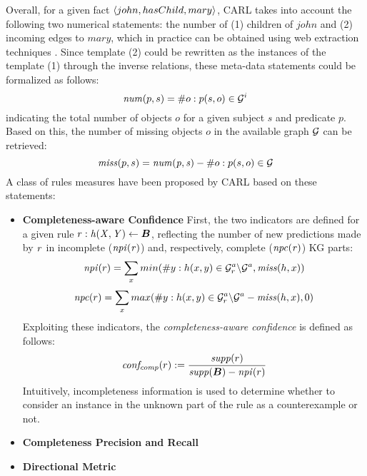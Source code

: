 Overall, for a given fact $\langle john, hasChild, mary\rangle$, CARL takes into account the following two numerical statements: the number of (1) children of $john$ and (2) incoming edges to $mary$, which in practice can be obtained using web extraction techniques \cite{cardinality-extraction-iswc-2016}. Since template (2) could be rewritten as the instances of the template (1) through the inverse relations, these meta-data statements could be formalized as follows:
\[\mathit{num}(p,s) = \# o : p(s,o) \in \mathcal{G}^i\]
indicating the total number of objects $o$ for a given subject $s$ and predicate $p$. Based on this, the number of missing objects $o$ in the available graph $\mathcal{G}$ can be retrieved:
\[\mathit{miss}(p,s) = \mathit{num(p,s)} - \#o : p(s,o) \in \mathcal{G}\]
A class of rules measures have been proposed by CARL based on these statements:
\begin{itemize}
\item \textbf{Completeness-aware Confidence}
First, the two indicators are defined for a given rule $r: %
\mi{h(X,Y)}\leftarrow \vec{B}$, %
reflecting the number of new 
predictions made by $\mathit{r}$ in incomplete ($\mathit{npi(r)}$) and, respectively, complete ($\mathit{npc(r)}$) KG parts:
\begin{align*}
\mathit{npi}(r) = \sum_x min(\#y: h(x,y)\in \mathcal{G}^a_r\backslash \mathcal{G}^a, \mathit{miss}(h,x))
\end{align*}
\vspace{-\topsep}
\begin{align*}
\mathit{npc}(r) = \sum_x max(\#y: h(x,y)\in\mathcal{G}^a_r\backslash \mathcal{G}^a - \mathit{miss}(h,x), 0)
\end{align*}
Exploiting these indicators, the \emph{completeness-aware confidence} is defined as follows:
\begin{equation}\label{eq:comp_conf}
\mi{conf_{comp}}(r) := \frac{\mi{supp}(r)}{\mi{supp}(\vec{B}) - \mi{npi}(r)}
\end{equation}
Intuitively, incompleteness information is used to determine whether to consider an instance in the unknown part of the rule as a counterexample or not.
\item \textbf{Completeness Precision and Recall}
\item \textbf{Directional Metric}
\end{itemize}
